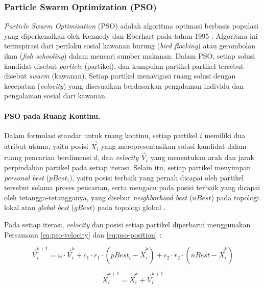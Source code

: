 \subsubsection{Particle Swarm Optimization (PSO)}
\label{subsubsec:pso}

\textit{Particle Swarm Optimization} (PSO) adalah algoritma optimasi berbasis populasi yang diperkenalkan oleh Kennedy dan Eberhart pada tahun 1995 \cite{kennedy1995particle}. Algoritma ini terinspirasi dari perilaku sosial kawanan burung (\textit{bird flocking}) atau gerombolan ikan (\textit{fish schooling}) dalam mencari sumber makanan. Dalam PSO, setiap solusi kandidat disebut \textit{particle} (partikel), dan kumpulan partikel-partikel tersebut disebut \textit{swarm} (kawanan). Setiap partikel menavigasi ruang solusi dengan kecepatan (\textit{velocity}) yang disesuaikan berdasarkan pengalaman individu dan pengalaman sosial dari kawanan.

\paragraph{PSO pada Ruang Kontinu.}
\label{par:con-pso}

Dalam formulasi standar untuk ruang kontinu, setiap partikel $i$ memiliki dua atribut utama, yaitu posisi $\vec{X}_i$ yang merepresentasikan solusi kandidat dalam ruang pencarian berdimensi $d$, dan \textit{velocity} $\vec{V}_i$ yang menentukan arah dan jarak perpindahan partikel pada setiap iterasi. Selain itu, setiap partikel menyimpan \textit{personal best} ($pBest_i$), yaitu posisi terbaik yang pernah dicapai oleh partikel tersebut selama proses pencarian, serta mengacu pada posisi terbaik yang dicapai oleh tetangga-tetangganya, yang disebut \textit{neighborhood best} ($nBest$) pada topologi lokal atau \textit{global best} ($gBest$) pada topologi global \cite{kennedy1995particle}.

Pada setiap iterasi, \textit{velocity} dan posisi setiap partikel diperbarui menggunakan Persamaan \ref{eq:pso-velocity} dan \ref{eq:pso-position} \cite{kennedy1995particle}:

\begin{equation}
	\vec{V}_{i}^{k+1} = \omega \cdot \vec{V}_{i}^{k} + c_1 \cdot r_1 \cdot (pBest_i - \vec{X}_{i}^{k}) + c_2 \cdot r_2 \cdot (nBest - \vec{X}_{i}^{k})
	\label{eq:pso-velocity}
\end{equation}

\begin{equation}
	\vec{X}_{i}^{k+1} = \vec{X}_{i}^{k} + \vec{V}_{i}^{k+1}
	\label{eq:pso-position}
\end{equation}

